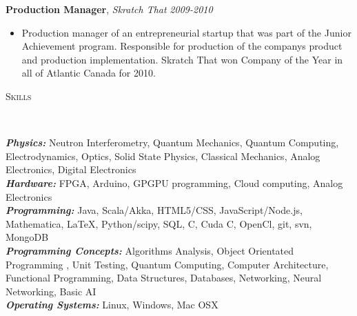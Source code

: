 \documentclass[9pt]{article}
\newenvironment{changemargin}[2]{%
  \begin{list}{}{%
    \setlength{\topsep}{0pt}%
    \setlength{\leftmargin}{#1}%
    \setlength{\rightmargin}{#2}%
    \setlength{\listparindent}{\parindent}%
    \setlength{\itemindent}{\parindent}%
    \setlength{\parsep}{\parskip}%
  }%
  \item[]}{\end{list}
}
\newcommand{\lineover}{
	\begin{changemargin}{-0.05in}{-0.05in}
		\vspace*{-8pt}
		\hrulefill \\
		\vspace*{-2pt}
	\end{changemargin}
}
\newcommand{\header}[1]{
	\begin{changemargin}{-0.5in}{-0.5in}
		\scshape{#1}\\
  	\lineover
	\end{changemargin}
}
\newenvironment{body} {
	\vspace*{-16pt}
	\begin{changemargin}{-0.25in}{-0.5in}
  }	
	{\end{changemargin}
}
\begin{document}
\begin{body}
	\textbf {Production Manager}, \emph{Skratch That} \hfill \emph{2009-2010}\\
	\vspace*{-4pt}
	\begin{itemize} \itemsep -0pt
		\item Production manager of an entrepreneurial startup that was part of the Junior Achievement program.
Responsible for production of the companys product and production implementation. Skratch That won
Company of the Year in all of Atlantic Canada for 2010.
	\end{itemize}
\end{body}

\smallskip







\header{Skills}

\begin{body}
	\vspace{14pt}

	\emph{\textbf{Physics:}}{} Neutron Interferometry, Quantum Mechanics, Quantum Computing, Electrodynamics, Optics, Solid State Physics, Classical Mechanics, Analog Electronics, Digital Electronics\\
	\medskip
	\emph{\textbf{Hardware:}}{} FPGA, Arduino, GPGPU programming, Cloud computing, Analog Electronics\\
	\medskip
	\emph{\textbf{Programming:}}{} 
Java, Scala/Akka, HTML5/CSS, JavaScript/Node.js, Mathematica, \LaTeX, Python/scipy,
SQL, C, Cuda C, OpenCl, git, svn, MongoDB\\
	\medskip
	\emph{\textbf{Programming Concepts:}}{} Algorithms Analysis, Object Orientated Programming , Unit Testing, Quantum
Computing, Computer Architecture, Functional Programming, Data Structures, Databases, Networking,
Neural Networking, Basic AI\\

	
	\medskip
	\emph{\textbf{Operating Systems:}}{} Linux, Windows, Mac OSX\\

	

	
\end{body}
\end{document}
